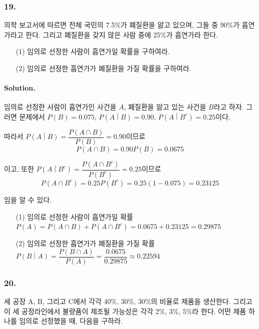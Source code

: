 \subsubsection{19.} 의학 보고서에 따르면 전체 국민의 7.5\%가 폐질환을 앓고 있으며, 그들 중 90\%가 흡연가라고 한다. 그리고 폐질환을 갖지 않은 사람 중에 25\%가 흡연가라 한다.
\begin{itemize}
	\item[(1)] 임의로 선정한 사람이 흡연가일 확률을 구하여라.
	\item[(2)] 임의로 선정한 흡연가가 폐질환을 가질 확률을 구하여라.
\end{itemize}

\paragraph{Solution.} 임의로 선정한 사람이 흡연가인 사건을 $A$, 폐질환을 앓고 있는 사건을 $B$라고 하자. 그러면 문제에서 $P\left(B\right) = 0.075$, $P\left(A\middle|B\right) = 0.90$, $P\left(A\middle|B^c\right) = 0.25$이다.

따라서 $P\left(A\middle|B\right) = \dfrac{P\left(A \cap B\right)}{P\left(B\right)} = 0.90$이므로 \[P\left(A \cap B\right) = 0.90P\left(B\right) = 0.0675\]

이고, 또한 $P\left(A\middle|B^c\right) = \dfrac{P\left(A \cap B^c\right)}{P\left(B^c\right)} = 0.25$이므로 \[P\left(A \cap B^c\right) = 0.25P\left(B^c\right) = 0.25\left(1 - 0.075\right) = 0.23125\]

임을 알 수 있다.

\begin{itemize}
	\item[(1)] 임의로 선정한 사람이 흡연가일 확률 $P\left(A\right) = P\left(A \cap B\right) + P\left(A \cap B^c\right) = 0.0675 + 0.23125 = 0.29875$
	\item[(2)] 임의로 선정한 흡연가가 폐질환을 가질 확률 $P\left(B\middle|A\right) = \dfrac{P\left(B\cap A\right)}{P\left(A\right)} =\dfrac{0.0675}{0.29875}\approx 0.22594$
\end{itemize}

\subsubsection{20.} 세 공장 A, B, 그리고 C에서 각각 40\%, 30\%, 30\%의 비율로 제품을 생산한다. 그리고 이 세 공정라인에서 불량품이 제조될 가능성은 각각 2\%, 3\%, 5\%라 한다. 어떤 제품 하나를 임의로 선정했을 때, 다음을 구하라.

